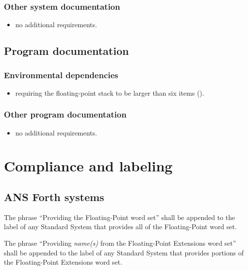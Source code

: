 \subsubsection{Other system documentation} %
\begin{itemize}
\item no additional requirements.
\end{itemize}

\subsection{Program documentation} %

\subsubsection{Environmental dependencies} %

\begin{itemize}
\item requiring the floating-point stack to be larger than six items
	().
\end{itemize}

\subsubsection{Other program documentation} %
\begin{itemize}
\item no additional requirements.
\end{itemize}

\section{Compliance and labeling} %

\subsection{ANS Forth systems} %

The phrase ``Providing the Floating-Point word set'' shall be
appended to the label of any Standard System that provides all of
the Floating-Point word set.

The phrase ``Providing \emph{name(s)} from the Floating-Point
Extensions word set'' shall be appended to the label of any Standard
System that provides portions of the Floating-Point Extensions word
set.

